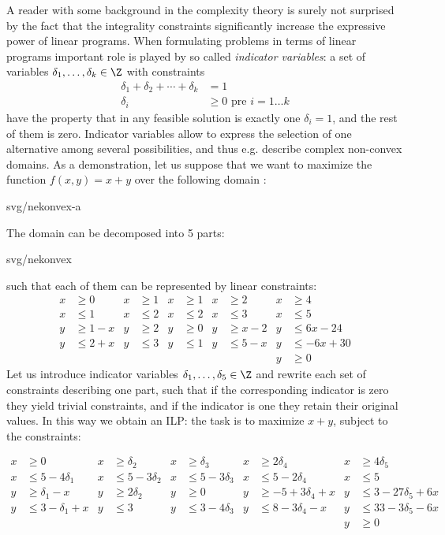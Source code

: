 \noindent 
A reader with some background in the complexity theory is surely not surprised by the fact that the integrality
constraints significantly increase the expressive power of linear programs. When formulating problems in terms of 
linear programs important role is played by so called {\em indicator variables}: a set of variables  $\delta_1,\ldots,\delta_k\in\Z$ 
with constraints 
\begin{align*}
  \delta_1+\delta_2+\cdots+\delta_k&=1\\
  \delta_i&\ge0\text{\ pre\ }i=1\ldots k
\end{align*}
have the property that in any feasible solution is exactly one $\delta_i=1$, and the rest of them is zero.
Indicator variables allow to express the selection of one alternative among several possibilities, and
thus e.g. describe complex non-convex domains. As a demonstration, let us suppose that we want to maximize the 
function $f(x,y)=x+y$ over the following domain \dom:

\begin{myfig}{0.4\textwidth}{svg/nekonvex-a}
\end{myfig}

\noindent
The domain \dom can be decomposed into 5 parts:
\begin{myfig}{0.4\textwidth}{svg/nekonvex}
\end{myfig}
such that each of them can be represented by linear constraints:
\begin{align*}
  x&\ge0    & x&\ge1 & x&\ge1 & x&\ge2    & x&\ge4\\
  x&\le1    & x&\le2 & x&\le2 & x&\le3    & x&\le5\\
  y&\ge1-x  & y&\ge2 & y&\ge0 & y&\ge x-2 & y&\le6x-24\\
  y&\le2+x  & y&\le3 & y&\le1 & y&\le5-x  & y&\le-6x+30\\
   &        &  &     &  &     &  &        & y&\ge0
\end{align*}
Let us introduce indicator variables
$\delta_1,\ldots,\delta_5\in\Z$ 
and rewrite each set of constraints describing one part, such that if the corresponding indicator is zero they
yield trivial constraints, and if the indicator is one they retain their original values. In this way we obtain 
an ILP: the task is to maximize $x+y$, subject to the constraints:


\begin{align*}
  x&\ge0                  & x&\ge\delta_2    & x&\ge\delta_3    & x&\ge2\delta_4            & x&\ge4\delta_5\\
  x&\le5-4\delta_1        & x&\le5-3\delta_2 & x&\le5-3\delta_3 & x&\le5-2\delta_4          & x&\le5\\
  y&\ge\delta_1-x         & y&\ge2\delta_2   & y&\ge0           & y&\ge-5+3\delta_4+x  & y&\le3-27\delta_5+6x\\
  y&\le3-\delta_1+x   & y&\le3           & y&\le3-4\delta_3 & y&\le8-3\delta_4-x    & y&\le33-3\delta_5-6x\\
   &                      &  &               &  &               &  &                        & y&\ge0
\end{align*}

